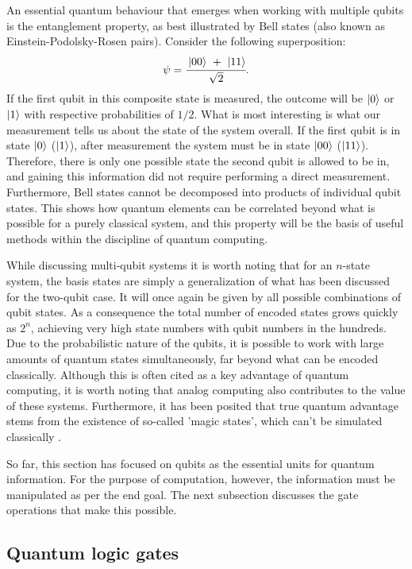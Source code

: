 An essential quantum behaviour that emerges when working with multiple qubits is the entanglement property, as best illustrated by Bell states (also known as Einstein-Podolsky-Rosen pairs). Consider the following superposition:
\begin{equation}
    \psi = \cfrac{\ket{00}\ +\ \ket{11}}{\sqrt{2}}.
\end{equation}
If the first qubit in this composite state is measured, the outcome will be $\ket{0}$ or $\ket{1}$ with respective probabilities of $1/2$. What is most interesting is what our measurement tells us about the state of the system overall. If the first qubit is in state $\ket{0}$ ($\ket{1}$), after measurement the system must be in state $\ket{00}$ ($\ket{11}$). Therefore, there is only one possible state the second qubit is allowed to be in, and gaining this information did not require performing a direct measurement.
Furthermore, Bell states cannot be decomposed into products of individual qubit states. This shows how quantum elements can be correlated beyond what is possible for a purely classical system, and this property will be the basis of useful methods within the discipline of quantum computing. 

While discussing multi-qubit systems it is worth noting that for an $n$-state system, the basis states are simply a generalization of what has been discussed for the two-qubit case. It will once again be given by all possible combinations of qubit states. As a consequence the total number of encoded states grows quickly as $2^n$, achieving very high state numbers with qubit numbers in the hundreds. Due to the probabilistic nature of the qubits, it is possible to work with large amounts of quantum states simultaneously, far beyond what can be encoded classically. Although this is often cited as a key advantage of quantum computing, it is worth noting that analog computing also contributes to the value of these systems. Furthermore, it has been posited that true quantum advantage stems from the existence of so-called 'magic states', which can't be simulated classically \cite{Zhang2024, Oliviero2022}.

So far, this section has focused on qubits as the essential units for quantum information. For the purpose of computation, however, the information must be manipulated as per the end goal. The next subsection discusses the gate operations that make this possible.


\subsection{Quantum logic gates}

